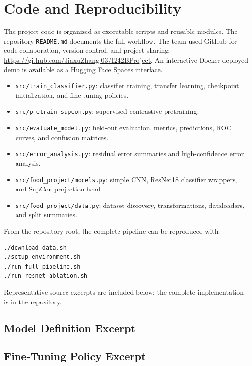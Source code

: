 \section{Code and Reproducibility}

The project code is organized as executable scripts and reusable modules. The repository \texttt{README.md} documents the full workflow. The team used GitHub for code collaboration, version control, and project sharing: \url{https://github.com/JiaxuZhang-03/I242BProject}. An interactive Docker-deployed demo is available as a \href{https://huggingface.co/spaces/LittleOtterUD/INDENGInterface}{Hugging Face Spaces interface}.

\begin{itemize}[leftmargin=*]
  \item \texttt{src/train\_classifier.py}: classifier training, transfer learning, checkpoint initialization, and fine-tuning policies.
  \item \texttt{src/pretrain\_supcon.py}: supervised contrastive pretraining.
  \item \texttt{src/evaluate\_model.py}: held-out evaluation, metrics, predictions, ROC curves, and confusion matrices.
  \item \texttt{src/error\_analysis.py}: residual error summaries and high-confidence error analysis.
  \item \texttt{src/food\_project/models.py}: simple CNN, ResNet18 classifier wrappers, and SupCon projection head.
  \item \texttt{src/food\_project/data.py}: dataset discovery, transformations, dataloaders, and split summaries.
\end{itemize}

\noindent From the repository root, the complete pipeline can be reproduced with:

\begin{Verbatim}[fontsize=\small]
./download_data.sh
./setup_environment.sh
./run_full_pipeline.sh
./run_resnet_ablation.sh
\end{Verbatim}

\noindent Representative source excerpts are included below; the complete implementation is in the repository.

\subsection{Model Definition Excerpt}


\subsection{Fine-Tuning Policy Excerpt}


